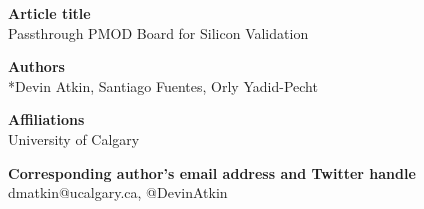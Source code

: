 \textbf{Article title}\\
Passthrough PMOD Board for Silicon Validation

\textbf{Authors}\\
*Devin Atkin, Santiago Fuentes, Orly Yadid-Pecht

\textbf{Affiliations}\\
University of Calgary

\textbf{Corresponding author’s email address and Twitter handle}\\ 
dmatkin@ucalgary.ca, @DevinAtkin
